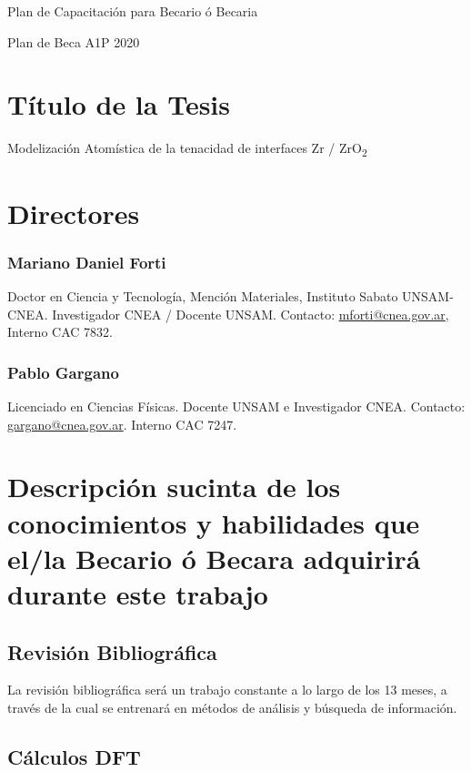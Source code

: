 \begin{center}

Plan de Capacitación para Becario ó Becaria 

Plan de Beca A1P 2020

\end{center}

\section*{ Título de la Tesis }

Modelización Atomística de la tenacidad de interfaces Zr / ZrO\textsubscript{2}

\section*{Directores}

\subsubsection{Mariano Daniel Forti}

Doctor en Ciencia y Tecnología, Mención Materiales, Instituto Sabato 
UNSAM-CNEA. Investigador CNEA / Docente UNSAM. 
Contacto: \href{mailto:mforti@cnea.gov.ar}{mforti@cnea.gov.ar}, Interno CAC 7832.

\subsubsection{Pablo Gargano}

Licenciado en Ciencias Físicas. Docente UNSAM e Investigador CNEA.
Contacto: \href{mailto:gargano@cnea.gov.ar}{gargano@cnea.gov.ar}. Interno CAC 7247.


\section*{Descripción sucinta de los conocimientos y habilidades que el/la  
 Becario ó Becara adquirirá durante este trabajo }

\subsection{ Revisión Bibliográfica}

La revisión bibliográfica será un trabajo constante a lo largo de los 13 meses, 
a través de la cual se entrenará en métodos de análisis y búsqueda de 
información.

\subsection{ Cálculos DFT}

